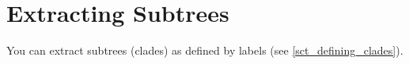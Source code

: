 

\section{Extracting Subtrees}
\label{sct_subtrees}

You can extract subtrees (clades) as defined by labels (see \ref{sct_defining_clades}).

